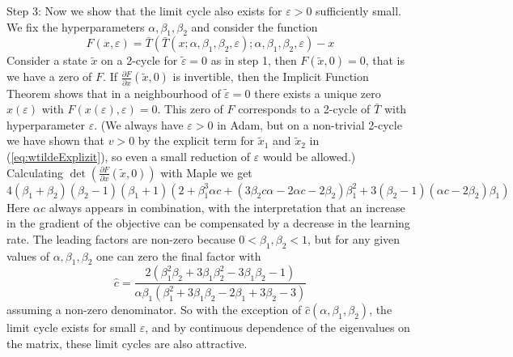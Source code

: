 \documentclass[runningheads]{llncs}
\def\weight{w}
\def\refb#1{(\ref{#1})}
\begin{document}
Step 3: Now we show that the limit cycle also exists for $\varepsilon>0$ sufficiently
small. We fix the hyperparameters $\alpha, \beta_1, \beta_2$ and consider the function
$$
F(x,\varepsilon) = \bar T(\bar T(x; \alpha, \beta_1, \beta_2, \varepsilon); \alpha, \beta_1, \beta_2, \varepsilon) - x
$$
Consider a state $\tilde x$ on a 2-cycle for $\tilde \varepsilon=0$ as in step 1, then 
$F(\tilde x, 0)=0$, that is we have a zero of $F$. 
If $\frac {\partial F}{\partial x}(\tilde x, 0)$ is invertible,
then the Implicit Function Theorem  
shows that in a neighbourhood of $\tilde \varepsilon=0$ there exists a
unique zero $x(\varepsilon)$ with $F(x(\varepsilon),\varepsilon)=0$. This zero of $F$
corresponds to a 2-cycle of $\bar T$ with hyperparameter $\varepsilon$.
(We always have $\varepsilon>0$ in Adam, 
but on a non-trivial 2-cycle we have shown
that $v>0$ by the explicit term for $\tilde x_1$ and $\tilde x_2$ in \refb{eq:wtildeExplizit}, 
so even a small reduction of $\varepsilon$ would be allowed.)
Calculating $\det\left(\frac {\partial F}{\partial x}(\tilde x, 0)\right)$ with Maple
we get
\[
4(\beta_1+\beta_2)(\beta_2-1)(\beta_1+1)(2+\beta_1^3\alpha c+(3\beta_2 c\alpha-2\alpha c-2\beta_2)\beta_1^2+3(\beta_2-1)(\alpha c-2\beta_2) \beta_1)
\]
Here $\alpha c$ always appears in combination, with the interpretation that an increase
in the gradient of the objective can be compensated by a decrease in the learning rate.
The leading factors are non-zero because $0<\beta_1,\beta_2<1$, but for any given values 
of $\alpha, \beta_1, \beta_2$ one can zero the final factor with 
\begin{equation}
\label{eq:cException}
 \hat c= \frac {2(\beta_1^2\beta_2+3\beta_1\beta_2^2-3\beta_1\beta_2-1)}{\alpha\beta_1(\beta_1^2+3\beta_1\beta_2-2\beta_1+3\beta_2-3)}
\end{equation}
assuming a non-zero denominator. 
So with the exception of $\hat c(\alpha, \beta_1, \beta_2)$, the limit cycle exists for 
small $\varepsilon$, and by continuous dependence of the eigenvalues on the matrix, 
these limit cycles are also attractive. 
\end{document}

